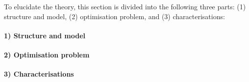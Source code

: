 To elucidate the theory, this section is divided into the following three parts: (1) structure and model, (2) optimisation problem, and (3) characterisations:

\paragraph{1) Structure and model}


\paragraph{2) Optimisation problem}
\label{sec:Block-Optimization-Review} 

\newpage

\paragraph{3) Characterisations}
